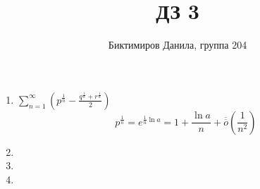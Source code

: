 \documentclass[11pt]{article}
\begin{document}
	
	\author{Биктимиров Данила, группа 204}
	\title{ДЗ 3}
	\date{}
	\maketitle
	
	\medskip
	
	\begin{enumerate}
		
		\item $\sum_{n=1}^{\infty} \left(p^{\frac{1}{n}}-\frac{q^{\frac{1}{n}} + r^{\frac{1}{n}}}{2} \right)$
		$$p^{\frac{1}{n}} = e^{\frac{1}{n}\ln a}=1+\frac{\ln a}{n} + \overline{\overline{o}} \left(\frac{1}{n^2}\right)$$
		
		\item
		
		\item
		
		\item
		
	\end{enumerate}
\end{document}
